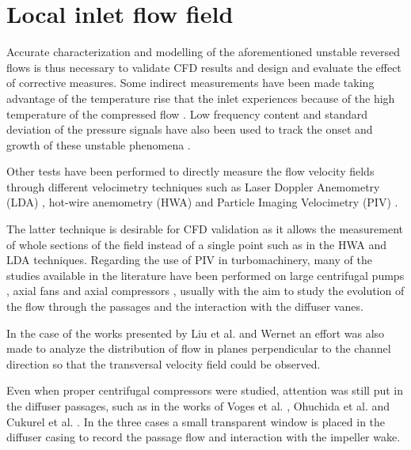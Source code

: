 \section{Local inlet flow field}
\label{sec:liter_local_flow}

Accurate characterization and modelling of the aforementioned unstable reversed flows is thus necessary to validate CFD results and design and evaluate the effect of corrective measures. Some indirect measurements have been made taking advantage of the temperature rise that the inlet experiences because of the high temperature of the compressed flow \cite{andersen2009surge,figurella2012noise}. Low frequency content and standard deviation of the pressure signals have also been used to track the onset and growth of these unstable phenomena \cite{liu2013methods}.

Other tests have been performed to directly measure the flow velocity fields through different velocimetry techniques such as Laser Doppler Anemometry (LDA) \cite{pedersen2003flow}, hot-wire anemometry (HWA) \cite{oro2009forced,kalpakli2015combined} and Particle Imaging Velocimetry (PIV) \cite{wernet2000development,liu2006application,pedersen2003flow}.

The latter technique is desirable for CFD validation as it allows the measurement of whole sections of the field instead of a single point such as in the HWA and LDA techniques. Regarding the use of PIV in turbomachinery, many of the studies available in the literature have been performed on large centrifugal pumps \cite{pedersen2003flow,dazin2011high,wu2011piv}, axial fans \cite{fike2014visualisation,oro2009forced} and axial compressors \cite{liu2006application,wernet2000development,wernet2000application,wernet2001investigation}, usually with the aim to study the evolution of the flow through the passages and the interaction with the diffuser vanes. 

In the case of the works presented by Liu et al. \cite{liu2006application} and Wernet \cite{wernet2000development,wernet2000application} an effort was also made to analyze the distribution of flow in planes perpendicular to the channel direction so that the transversal velocity field could be observed.

Even when proper centrifugal compressors were studied, attention was still put in the diffuser passages, such as in the works of Voges et al. \cite{voges2007application}, Ohuchida et al. \cite{ohuchida2013internal} and Cukurel et al. \cite{cukurel2010particle}. In the three cases a small transparent window is placed in the diffuser casing to record the passage flow and interaction with the impeller wake.

